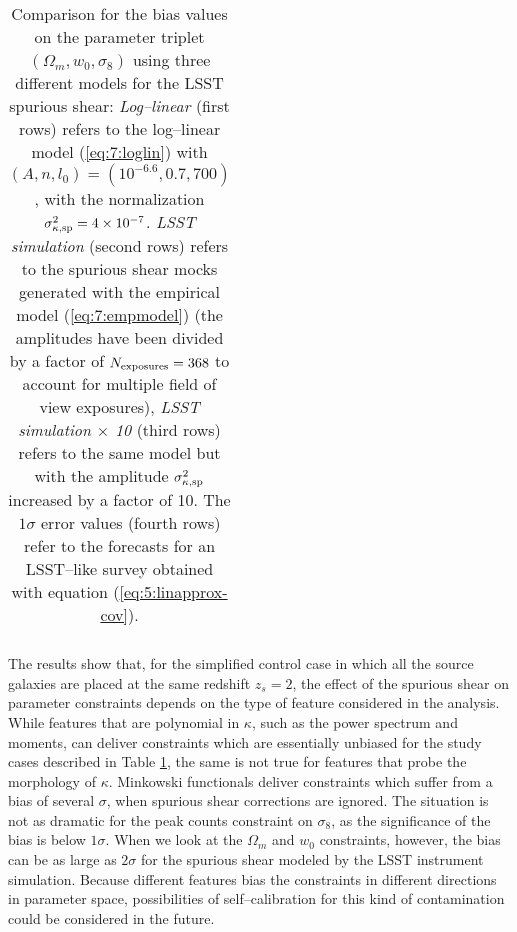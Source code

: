 \begin{table}
\begin{center}
\begin{tabular}{c|ccc}
\end{tabular}
\end{center}

\caption{Comparison for the bias values on the parameter triplet $(\Omega_m,w_0,\sigma_8)$ using three different models for the LSST spurious shear: \textit{Log--linear} (first rows) refers to the log--linear model (\ref{eq:7:loglin}) with $(A,n,l_0)=(10^{-6.6},0.7,700)$, with the normalization $\sigma^2_{\kappa,{\rm sp}}=4\times10^{-7}$. \textit{LSST simulation} (second rows) refers to the spurious shear mocks generated with the empirical model (\ref{eq:7:empmodel}) (the amplitudes have been divided by a factor of $N_{\rm exposures}=368$ to account for multiple field of view exposures), \textit{LSST simulation $\times$ 10} (third rows) refers to the same model but with the amplitude $\sigma^2_{\kappa,{\rm sp}}$ increased by a factor of 10. The $1\sigma$ error values (fourth rows) refer to the forecasts for an LSST--like survey obtained with equation (\ref{eq:5:linapprox-cov}).}
\label{tab:7:spbias}
\end{table}
%
The results show that, for the simplified control case in which all the source galaxies are placed at the same redshift $z_s=2$, the effect of the spurious shear on parameter constraints depends on the type of feature considered in the analysis. While features that are polynomial in $\kappa$, such as the power spectrum and moments, can deliver constraints which are essentially unbiased for the study cases described in Table \ref{tab:7:spbias}, the same is not true for features that probe the morphology of $\kappa$. Minkowski functionals deliver constraints which suffer from a bias of several $\sigma$, when spurious shear corrections are ignored. The situation is not as dramatic for the peak counts constraint on $\sigma_8$, as the significance of the bias is below $1\sigma$. When we look at the $\Omega_m$ and $w_0$ constraints, however, the bias can be as large as $2\sigma$ for the spurious shear modeled by the LSST instrument simulation. Because different features bias the constraints in different directions in parameter space, possibilities of self--calibration for this kind of contamination could be considered in the future.

